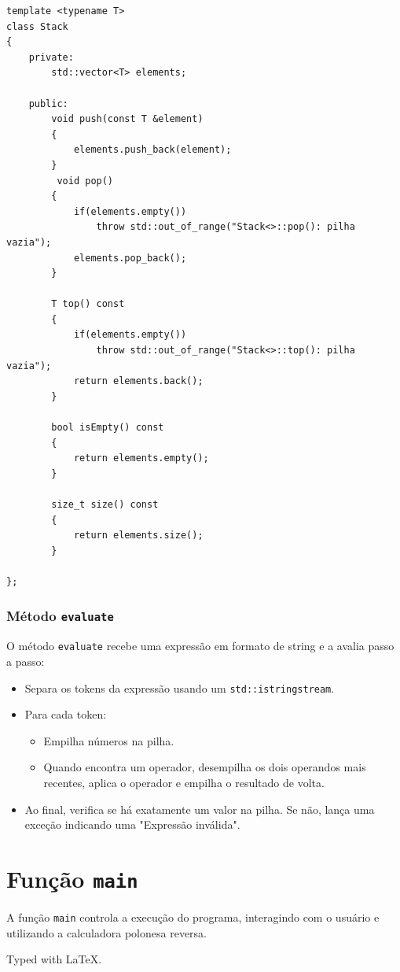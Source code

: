 \documentclass[a4paper,12pt]{article}
\begin{document}
\begin{minipage}{\linewidth}
\begin{lstlisting}[caption={Implementação da classe \texttt{Stack}}, label={lst:stack}]
template <typename T>
class Stack
{
    private:
        std::vector<T> elements;

    public:
        void push(const T &element)
        {
            elements.push_back(element);
        }
         void pop()
        {
            if(elements.empty())
                throw std::out_of_range("Stack<>::pop(): pilha vazia");
            elements.pop_back();
        }

        T top() const
        {
            if(elements.empty())
                throw std::out_of_range("Stack<>::top(): pilha vazia");
            return elements.back();
        }

        bool isEmpty() const
        {
            return elements.empty();
        }

        size_t size() const
        {
            return elements.size();
        }

};

\end{lstlisting}
\end{minipage}
\subsubsection{Método \texttt{evaluate}}
O método \texttt{evaluate} recebe uma expressão em formato de string e a avalia passo a passo:
\begin{itemize}
    \item Separa os tokens da expressão usando um \texttt{std::istringstream}.
    \item Para cada token:
      \begin{itemize}
        \item Empilha números na pilha.
        \item Quando encontra um operador, desempilha os dois operandos mais recentes, aplica o operador e empilha o resultado de volta.
      \end{itemize}
    \item Ao final, verifica se há exatamente um valor na pilha. Se não, lança uma exceção indicando uma "Expressão inválida".
\end{itemize}
\newpage
\section{Função \texttt{main}}
A função \texttt{main} controla a execução do programa, interagindo com o usuário e utilizando a calculadora polonesa reversa.

%



\vfill

Typed with \LaTeX.
\end{document}
